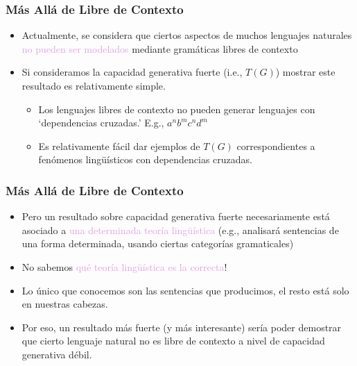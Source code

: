 \documentclass[compress,color=usenames]{beamer}
\newcommand{\mH}[1]{\textcolor{Plum}{#1}}
\begin{document}
\begin{frame}
\frametitle{M\'as All\'a de Libre de Contexto}

\begin{itemize}
\item Actualmente, se considera que ciertos aspectos de muchos lenguajes naturales
\mH{no pueden ser modelados} mediante gram\'aticas libres de contexto

\item Si consideramos la capacidad generativa fuerte (i.e., $T(G)$) mostrar este 
resultado es relativamente simple.
\begin{itemize}
\item Los lenguajes libres de contexto no pueden generar lenguajes con `dependencias cruzadas.' 
E.g., $a^nb^mc^nd^m$
\item Es relativamente f\'acil dar ejemplos de $T(G)$ correspondientes a fen\'omenos ling\"u\'isticos
con dependencias cruzadas.
\end{itemize}

\end{itemize}

\end{frame}

\begin{frame}
\frametitle{M\'as All\'a de Libre de Contexto}

\begin{itemize}
\item Pero un resultado sobre capacidad generativa fuerte necesariamente 
est\'a asociado a \mH{una determinada teor\'ia ling\"u\'istica} (e.g., analisar\'a 
sentencias de una forma determinada, usando ciertas categor\'ias gramaticales)

\item No sabemos \mH{qu\'e teor\'ia ling\"u\'istica es la correcta}!

\item Lo \'unico que conocemos son las sentencias que producimos, el resto est\'a 
solo en nuestras cabezas. 

\item Por eso, un resultado m\'as fuerte (y m\'as interesante) ser\'ia poder 
demostrar que cierto lenguaje natural no es libre de contexto a nivel de capacidad generativa d\'ebil.
\end{itemize}
\end{frame}
\end{document}
